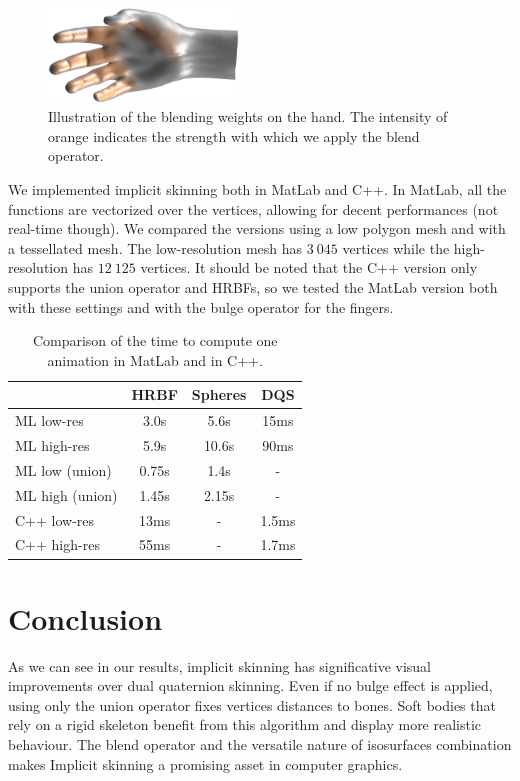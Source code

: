 \documentclass[a4paper,10pt]{article}
\begin{document}
\begin{multicols}{2}
\begin{figure}[H]
\centering
\includegraphics[width=0.45\textwidth]{figs/hand_bone_blend_weights}
\caption{Illustration of the blending weights on the hand.
The intensity of orange indicates the strength with which we apply the blend operator.}
\end{figure}

We implemented implicit skinning both in MatLab and C++.
In MatLab, all the functions are vectorized over the vertices, allowing for decent performances (not real-time though).
We compared the versions using a low polygon mesh and with a tessellated mesh.
The low-resolution mesh has $3\ 045$ vertices while the high-resolution has $12\ 125$ vertices.
It should be noted that the C++ version only supports the union operator and HRBFs, so we tested the MatLab version both with these settings and with the bulge operator for the fingers.

\begin{table}[H]
\centering
\begin{tabular}{ l | c c c }
  & HRBF & Spheres & DQS \\
  \hline
  ML low-res & 3.0s & 5.6s & 15ms \\
  ML high-res & 5.9s & 10.6s & 90ms \\
  ML low (union) & 0.75s & 1.4s & - \\
  ML high (union) & 1.45s & 2.15s & -\\
  C++ low-res & 13ms & - & 1.5ms \\
  C++ high-res & 55ms & - & 1.7ms
\end{tabular}
\caption{Comparison of the time to compute one animation in MatLab and in C++.}
\end{table}

\section{Conclusion}

As we can see in our results, implicit skinning has significative visual improvements over dual quaternion skinning.
Even if no bulge effect is applied, using only the union operator fixes vertices distances to bones.
Soft bodies that rely on a rigid skeleton benefit from this algorithm and display more realistic behaviour.
The blend operator and the versatile nature of isosurfaces combination makes Implicit skinning a promising asset in computer graphics.


\end{multicols}
\end{document}
